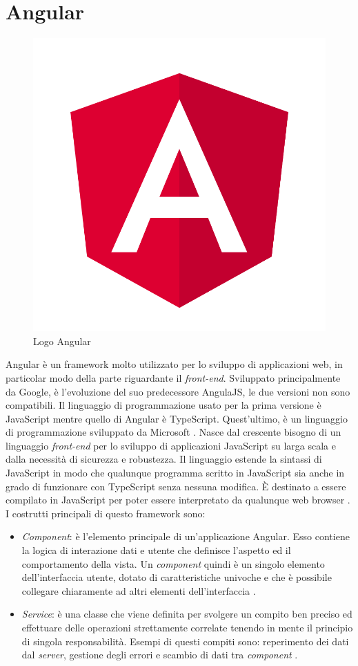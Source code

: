 
\section{Angular}

\begin{figure}
\begin{center}
\includegraphics[width=0.17\columnwidth]{images/angularlogopng.png}
\end{center}
\caption{Logo Angular}
\label{fig:angular}
\end{figure}

Angular è un \gls{framework} molto utilizzato per lo sviluppo di applicazioni web, in particolar modo della parte riguardante il \textit{front-end}. Sviluppato principalmente da Google, è l'evoluzione del suo predecessore AngulaJS, le due versioni non sono compatibili. Il linguaggio di programmazione usato per la prima versione è JavaScript mentre quello di Angular è TypeScript. Quest'ultimo, è un linguaggio di programmazione sviluppato da Microsoft \cite{angular}.
Nasce dal crescente bisogno di un linguaggio \textit{front-end} per lo sviluppo di applicazioni JavaScript su larga scala e dalla necessità di sicurezza e robustezza.
Il linguaggio estende la sintassi di JavaScript in modo che qualunque programma scritto in JavaScript sia anche in grado di funzionare con TypeScript senza nessuna modifica. È destinato a essere compilato in JavaScript per poter essere interpretato da qualunque web browser \cite{typescript}. I costrutti principali di questo framework sono: \cite{angulararchi}
\begin{itemize}
    \item \textit{Component}: è l’elemento principale di un’applicazione Angular.
    Esso contiene la logica di interazione dati e utente che definisce l’aspetto ed il comportamento della vista. Un \textit{component} quindi è un singolo elemento dell'interfaccia utente, dotato di caratteristiche univoche e che è possibile collegare chiaramente ad altri elementi dell'interfaccia \cite{component}.
    \item \textit{Service}:  è una classe che viene definita per svolgere un compito ben preciso ed effettuare delle operazioni strettamente correlate tenendo in mente il principio di singola responsabilità. Esempi di questi compiti sono: reperimento dei dati dal \textit{server}, gestione degli errori e scambio di dati tra \textit{component} \cite{service}. 
\end{itemize}

